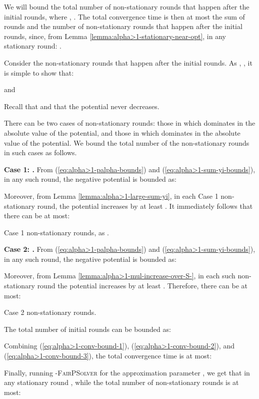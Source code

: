 \documentclass[11pt]{article}
\makeatletter
\newenvironment{proofof}[1]{\par
  \pushQED{\qed}\normalfont \topsep3\p@\relax
  \trivlist
  \item[\hskip\labelsep
        \bfseries
    Proof of #1\@addpunct{.}]\ignorespaces
}{\popQED\endtrivlist\@endpefalse
}
\makeatother
\begin{document}
\begin{proofof}{Theorem \ref{thm:convergence-alpha>1}}
We will bound the total number of non-stationary rounds that happen after the initial  rounds, where , . The total convergence time is then at most the sum of  rounds and the number of non-stationary rounds that happen after the initial  rounds, since, from Lemma \ref{lemma:alpha>1-stationary-near-opt}, in any stationary round: .

Consider the non-stationary rounds that happen after the initial  rounds. 
As , , it is simple to show that:

and


Recall that  and that the potential  never decreases.

There can be two cases of non-stationary rounds: those in which  dominates in the absolute value of the potential, and those in which  dominates in the absolute value of the potential. We bound the total number of the non-stationary rounds in such cases as follows.

\noindent\textbf{Case 1: .}  
From (\ref{eq:alpha>1-palpha-bounds}) and (\ref{eq:alpha>1-sum-yi-bounds}), in any such round, the negative potential is bounded as:

Moreover, from Lemma \ref{lemma:alpha>1-large-sum-yi}, in each Case 1 non-stationary round, the potential increases by at least . It immediately follows that there can be at most:

Case 1 non-stationary rounds, as .

\noindent\textbf{Case 2: .} From (\ref{eq:alpha>1-palpha-bounds}) and (\ref{eq:alpha>1-sum-yi-bounds}), in any such round, the negative potential is bounded as:

Moreover, from Lemma \ref{lemma:alpha>1-mul-increase-over-S-}, in each such non-stationary round the potential increases by at least . Therefore, there can be at most:

Case 2 non-stationary rounds.

The total number of initial  rounds can be bounded as:


Combining (\ref{eq:alpha>1-conv-bound-1}), (\ref{eq:alpha>1-conv-bound-2}), and (\ref{eq:alpha>1-conv-bound-3}), the total convergence time is at most:
 

Finally, running \textsc{-FairPSolver} for the approximation parameter , we get that in any stationary round , while the total number of non-stationary rounds is at most:
 
\end{proofof}
\end{document}
